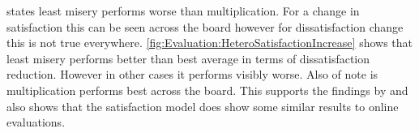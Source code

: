  states least misery performs worse than multiplication. For a change in satisfaction this can be seen across the board however for dissatisfaction change this is not true everywhere. \autoref{fig:Evaluation:HeteroSatisfactionIncrease} shows that least misery performs better than best average in terms of dissatisfaction reduction. However in other cases it performs visibly worse. Also of note is multiplication performs best across the board. This supports the findings by \citeauthor{Masthoff2015} \cite[p. 755f]{Masthoff2015} and also shows that the satisfaction model does show some similar results to online evaluations.  

